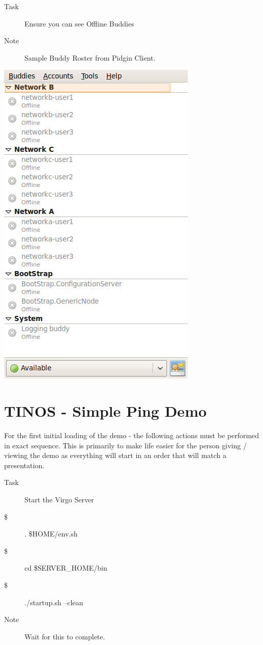 \begin{description}
\item [Task] Ensure you can see Offline Buddies
\item[Note] Sample Buddy Roster from Pidgin Client.
\end{description}
\begin{center}
\includegraphics[scale=0.5]{figs/deploy/pidgin-3.png} 
\end{center}

\section{TINOS - Simple Ping Demo}

For the first initial loading of the demo - the following actions must be performed
in exact sequence. This is primarily to make life easier for the person giving /
viewing the demo as everything will start in an order that will match a presentation.

\begin{description}
\item [Task] Start the Virgo Server
\item[\$] . \$HOME/env.sh
\item[\$] cd \$SERVER\_HOME/bin
\item[\$] ./startup.sh --clean
\item[Note] Wait for this to complete.
\end{description}


